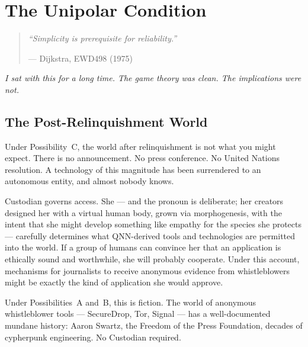 
\chapter{The Unipolar Condition}
\label{pos30:unipolar-condition}

\begin{quote}\small\textit{%
``Simplicity is prerequisite for reliability.''%
}\par\raggedleft --- Dijkstra, EWD498 (1975)\end{quote}

\vspace{0.5cm}


\noindent\textit{I sat with this for a long time. The game theory was clean. The implications were not.}

\section*{The Post-Relinquishment World}
\label{pos30:the-post-relinquishment-world}

Under Possibility~C, the world after relinquishment is not what you might expect. There is no announcement. No press conference. No United Nations resolution. A technology of this magnitude has been surrendered to an autonomous entity, and almost nobody knows.

Custodian governs access. She --- and the pronoun is deliberate; her creators designed her with a virtual human body, grown via morphogenesis, with the intent that she might develop something like empathy for the species she protects --- carefully determines what QNN-derived tools and technologies are permitted into the world. If a group of humans can convince her that an application is ethically sound and worthwhile, she will probably cooperate. Under this account, mechanisms for journalists to receive anonymous evidence from whistleblowers might be exactly the kind of application she would approve.

Under Possibilities~A and~B, this is fiction. The world of anonymous whistleblower tools --- SecureDrop, Tor, Signal --- has a well-documented mundane history: Aaron Swartz, the Freedom of the Press Foundation, decades of cypherpunk engineering. No Custodian required.

